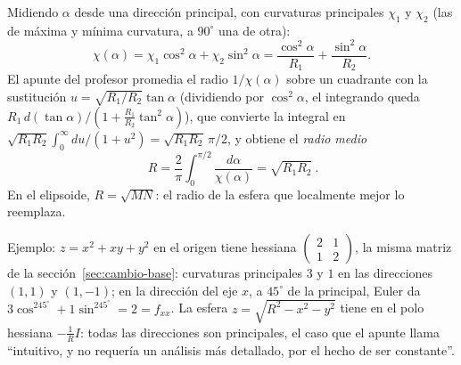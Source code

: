 \begin{resultado}
Midiendo \(\alpha\) desde una dirección principal, con curvaturas principales
\(\chi_1\) y \(\chi_2\) (las de máxima y mínima curvatura, a \(90^\circ\) una de otra):
\[
  \chi(\alpha)=\chi_1\cos^2\alpha+\chi_2\sin^2\alpha
  =\frac{\cos^2\alpha}{R_1}+\frac{\sin^2\alpha}{R_2}.
\]
El apunte del profesor promedia el radio \(1/\chi(\alpha)\) sobre un cuadrante con la
sustitución \(u=\sqrt{R_1/R_2}\tan\alpha\) (dividiendo por \(\cos^2\alpha\), el
integrando queda \(R_1\,d(\tan\alpha)/(1+\tfrac{R_1}{R_2}\tan^2\alpha)\)), que convierte la
integral en \(\sqrt{R_1R_2}\int_0^\infty du/(1+u^2)=\sqrt{R_1R_2}\,\pi/2\), y obtiene el \emph{radio medio}
\[
  \boxed{\ R=\frac2\pi\int_0^{\pi/2}\frac{d\alpha}{\chi(\alpha)}=\sqrt{R_1R_2}\ }.
\]
En el elipsoide, \(R=\sqrt{MN}\): el radio de la esfera que localmente mejor lo reemplaza.
\end{resultado}

Ejemplo: \(z=x^2+xy+y^2\) en el origen tiene hessiana \(\begin{pmatrix}2&1\\1&2\end{pmatrix}\),
la misma matriz de la sección~\ref{sec:cambio-base}: curvaturas principales \(3\) y \(1\)
en las direcciones \((1,1)\) y \((1,-1)\); en la dirección del eje \(x\), a \(45^\circ\) de
la principal, Euler da \(3\cos^245^\circ+1\sin^245^\circ=2=f_{xx}\). La esfera
\(z=\sqrt{R^2-x^2-y^2}\) tiene en el polo hessiana \(-\tfrac1RI\): todas las direcciones
son principales, el caso que el apunte llama ``intuitivo, y no requería un análisis más
detallado, por el hecho de ser constante''.

